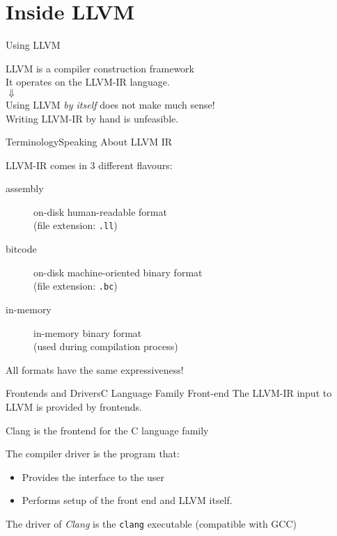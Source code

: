 
\section{Inside LLVM}


\begin{frame}{Using LLVM}
\begin{center}
LLVM is a \alert{compiler construction framework}\\
It operates on the \alert{LLVM-IR} language.\\
\bigskip
$\Downarrow$\\
\bigskip
Using LLVM \emph{by itself} does not make much sense!\\
Writing LLVM-IR by hand is unfeasible.
\end{center}
\end{frame}


\begin{frame}{Terminology}{Speaking About LLVM IR}
\begin{center}
LLVM-IR comes in 3 different flavours:
\end{center}
\bigskip
\begin{description}
\item[assembly] on-disk human-readable format\\(file extension: \texttt{.ll})
\item[bitcode] on-disk machine-oriented binary format\\(file extension: \texttt{.bc})
\item[in-memory] in-memory binary format\\(used during compilation process)
\end{description}
\bigskip
\begin{center}
All formats have the same expressiveness!
\end{center}
\vfill
\end{frame}


\begin{frame}{Frontends and Drivers}{C Language Family Front-end}
The LLVM-IR input to LLVM is provided by \alert{frontends}.
\begin{example}
\alert{Clang}\cite{LOCAL:www/clang} is the frontend for the C language family
\smallskip %
\end{example}

The \alert{compiler driver} is the program that:
\begin{itemize}
\item Provides the interface to the user
\item Performs setup of the front end and LLVM itself. 
\end{itemize}

\begin{example}
The driver of \emph{Clang} is the \texttt{clang} executable (compatible with GCC)
\end{example}
\end{frame}


